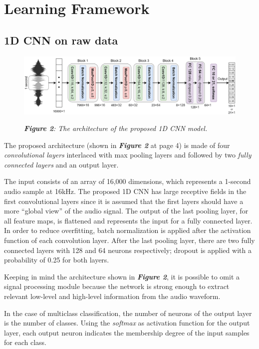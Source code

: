 \documentclass[conference]{IEEEtran}
\begin{document}
\section{Learning Framework}
\subsection{1D CNN on raw data}

\begin{figure}
\centering
\includegraphics[scale=0.16]{1DCNN}

\begin{small}\textit{\textbf{Figure 2}: The architecture of the proposed 1D CNN model.}
\end{small}
\end{figure}

The proposed architecture (shown in \textbf{\textit{Figure 2}} at page 4) is made of four \textit{convolutional layers} interlaced with max pooling layers and followed by two \textit{fully connected layers} and an output layer.

The input consists of an array of 16,000 dimensions, which represents a 1-second audio sample at 16kHz.
The proposed 1D CNN has large receptive fields in the first convolutional layers since it is assumed that the first layers should have a more “global view” of the audio signal. The output of the last pooling layer, for all feature maps, is flattened and represents the input for a fully connected layer. In order to reduce overfitting, batch normalization is applied after the activation function of each convolution layer. After the last pooling layer, there are two fully connected layers with 128 and 64 neurons respectively; dropout is applied with a probability of 0.25 for both layers.

Keeping in mind the architecture shown in \textbf{\textit{Figure 2}}, it is possible to omit a signal processing module because the network is strong enough to extract relevant low-level and high-level information from the audio waveform.

In the case of multiclass classification, the number of neurons of the output layer is the number of classes. Using the \textit{softmax} as activation function for the output layer, each output neuron indicates the membership degree of the input samples for each class.
\end{document}
